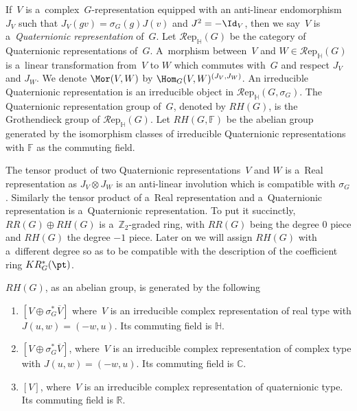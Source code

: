 \begin{Definition}
If~$V$ is a~complex~$G$-representation equipped with an anti-linear endomor\-phism~$J_V$ such that $J_V(gv)=
\sigma_G(g)J(v)$ and $J^2=-\Id
_V$, then we say~$V$ is a~\emph{Quaternionic representation} of~$G$.
Let $\mathcal{R}\text{ep}_\mathbb{H}(G)$ be the category of Quaternionic representations of~$G$.
A~morphism between~$V$ and $W\in \mathcal{R}\text{ep}_\mathbb{H}(G)$ is a~linear transformation from~$V$ to $W$ which commutes
with~$G$ and respect $J_V$ and $J_W$.
We denote $\Mor(V, W)$ by $\Hom_G(V, W)^{(J_V, J_W)}$.
An irreducible Quaternionic representation is an irreducible object in $\mathcal{R}\text{ep}_\mathbb{H}(G,
\sigma_G)$.
The Quaternionic representation group of~$G$, denoted by $RH(G)$, is the Grothendieck group of $\mathcal{R}\text{ep}_\mathbb{H}(G)$.
Let $RH(G, \mathbb{F})$ be the abelian group generated by the isomorphism classes of irreducible Quaternionic
representations with $\mathbb{F}$ as the commuting f\/ield.
\end{Definition}
\begin{Remark}
The tensor product of two Quaternionic representations~$V$ and $W$ is a~Real representation as $J_V\otimes J_W$ is an
anti-linear involution which is compatible with $\sigma_G$.
Similarly the tensor product of a~Real representation and a~Quaternionic representation is a~Quaternionic
representation.
To put it succinctly, $RR(G)\oplus RH(G)$ is a~$\mathbb{Z}
_2$-graded ring, with $RR(G)$ being the degree $0$ piece and $RH(G)$ the degree $-1$ piece.
Later on we will assign $RH(G)$ with a~dif\/ferent degree so as to be compatible with the description of the coef\/f\/icient
ring $KR^*_G(\pt)$.
\end{Remark}
\begin{Proposition}
\label{quatrepclassification}
$RH(G)$, as an abelian group, is generated by the following
\begin{enumerate}\itemsep=0pt
\item[$1.$]
$[V\oplus
\sigma_G^*\overline{V}]$ where~$V$ is an irreducible complex representation of real type with $J(u, w)=(-w, u)$.
Its commuting field is $\mathbb{H}$.
\item[$2.$]
$[V\oplus\sigma_G^*\overline{V}]$, where~$V$ is an irreducible complex representation of complex type with $J(u, w)=(-w, u)$.
Its commuting field is $\mathbb{C}$.
\item[$3.$]
$[V]$, where~$V$ is an irreducible complex representation of quaternionic type.
Its commuting field is $\mathbb{R}$.
\end{enumerate}
\end{Proposition}
